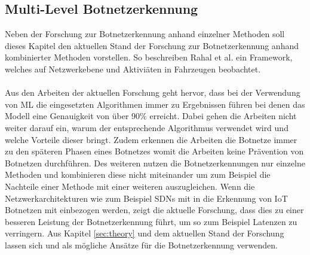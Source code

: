 \subsection*{Multi-Level Botnetzerkennung}
Neben der Forschung zur Botnetzerkennung anhand einzelner Methoden soll dieses Kapitel den aktuellen Stand der Forschung zur Botnetzerkennung anhand kombinierter Methoden vorstellen. So beschreiben Rahal et al. 
\cite{DBLP:journals/jnsm/RahalKGCG22} ein Framework, welches auf Netzwerkebene und Aktiviäten in Fahrzeugen beobachtet. \\ \\ Aus den Arbeiten der aktuellen Forschung geht hervor, dass bei der Verwendung 
von ML die eingesetzten Algorithmen immer zu Ergebnissen führen bei denen das Modell eine Genauigkeit von über 90\% erreicht. Dabei gehen die Arbeiten nicht weiter darauf ein, warum der entsprechende Algorithmus
verwendet wird und welche Vorteile dieser bringt. Zudem erkennen die Arbeiten die Botnetze immer zu den späteren Phasen eines Botnetzes womit die Arbeiten keine Prävention von Botnetzen durchführen. Des weiteren
nutzen die Botnetzerkennungen nur einzelne Methoden und kombinieren diese nicht miteinander um zum Beispiel die Nachteile einer Methode mit einer weiteren auszugleichen. Wenn die Netzwerkarchitekturen wie 
zum Beispiel SDNs mit in die Erkennung von IoT Botnetzen mit einbezogen werden, zeigt die aktuelle Forschung, dass dies zu einer besseren Leistung der Botnetzerkennung führt, um so zum Beispiel Latenzen zu verringern.
Aus Kapitel \ref{sec:theory} und dem aktuellen Stand der Forschung lassen sich \cite{Xing2021SurveyOB} und \cite{Wazzan2021InternetOT} als mögliche Ansätze für die Botnetzerkennung verwenden.
